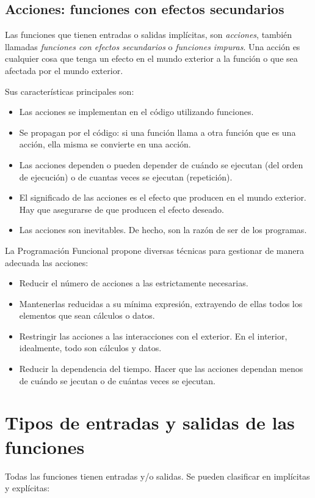 \subsection{Acciones: funciones con efectos secundarios}
\noindent Las funciones que tienen entradas o salidas implícitas, son \textit{acciones}, también llamadas \textit{funciones con efectos secundarios} o \textit{funciones impuras}. Una acción es cualquier cosa que tenga un efecto en el mundo exterior a la función o que sea afectada por el mundo exterior. 

Sus características principales son:

\begin{itemize}
   \item Las acciones se implementan en el código utilizando funciones.
   \item Se propagan por el código: si una función llama a otra función que es una acción, ella misma se convierte en una acción.
   \item Las acciones dependen o pueden depender de cuándo se ejecutan (del orden de ejecución) o de cuantas veces se ejecutan (repetición).
   \item El significado de las acciones es el efecto que producen en el mundo exterior. Hay que asegurarse de que producen el efecto deseado.
   \item Las acciones son inevitables. De hecho, son la razón de ser de los programas.
\end{itemize}

La Programación Funcional propone diversas técnicas para gestionar de manera adecuada las acciones:
\begin{itemize}
   \item Reducir el número de acciones a las estrictamente necesarias.
   \item Mantenerlas reducidas a su mínima expresión, extrayendo de ellas todos los elementos que sean cálculos o datos.
   \item Restringir las acciones a las interacciones con el exterior. En el interior, idealmente, todo son cálculos y datos.
   \item Reducir la dependencia del tiempo. Hacer que las acciones dependan menos de cuándo se jecutan o de cuántas veces se ejecutan.
\end{itemize}

\section{Tipos de entradas y salidas de las funciones}
\noindent Todas las funciones tienen entradas y/o salidas. Se pueden clasificar en implícitas y explícitas:

